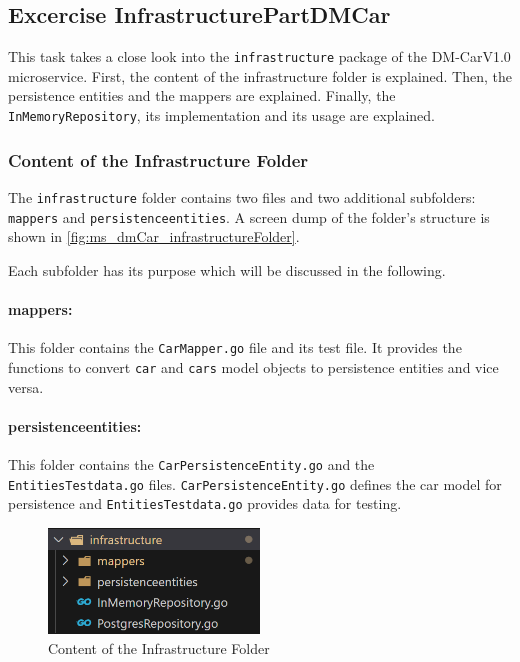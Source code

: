 \subsection{Excercise InfrastructurePartDMCar}
This task takes a close look into the \texttt{infrastructure} package of the DM-CarV1.0 microservice.
First, the content of the infrastructure folder is explained.
Then, the persistence entities and the mappers are explained.
Finally, the \texttt{InMemoryRepository}, its implementation and its usage are explained.

\subsubsection*{Content of the Infrastructure Folder}
The \texttt{infrastructure} folder contains two files and two additional subfolders: \texttt{mappers} and \texttt{persistenceentities}.
A screen dump of the folder's structure is shown in \autoref{fig:ms_dmCar_infrastructureFolder}.

Each subfolder has its purpose which will be discussed in the following.
\paragraph*{mappers:}
This folder contains the \texttt{CarMapper.go} file and its test file.
It provides the functions to convert \texttt{car} and \texttt{cars} model objects to persistence entities and vice versa.

\paragraph*{persistenceentities:}
This folder contains the \texttt{CarPersistenceEntity.go} and the \texttt{EntitiesTestdata.go} files.
\texttt{CarPersistenceEntity.go} defines the car model for persistence and \texttt{EntitiesTestdata.go} provides data for testing.
\begin{figure}
    \centering
    \includegraphics[width=0.5\textwidth]{figures/microservices/dmCar/ms_dmCar_infrastructureFolder.png}
    \caption{Content of the Infrastructure Folder}
    \label{fig:ms_dmCar_infrastructureFolder}
\end{figure}

